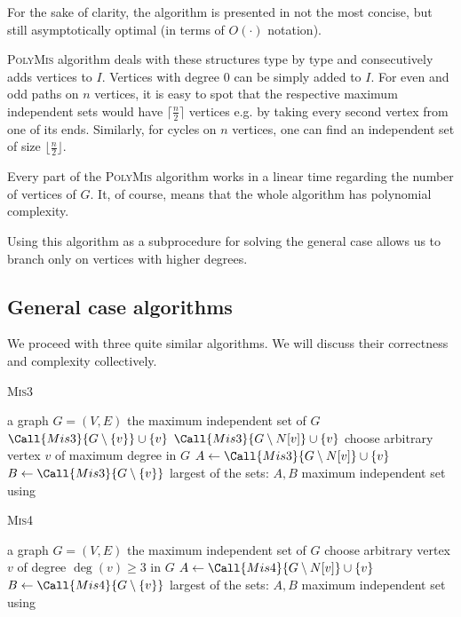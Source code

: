 For the sake of clarity, the algorithm is presented in not the most concise, but still asymptotically optimal (in terms of $O(\cdot)$ notation).

\textsc{PolyMis} algorithm deals with these structures type by type and consecutively adds vertices to $I$. Vertices with degree $0$ can be simply added to $I$. For even and odd paths on $n$ vertices, it is easy to spot that the respective maximum independent sets would have $\lceil\frac{n}{2}\rceil$ vertices e.g. by taking every second vertex from one of its ends. Similarly, for cycles on $n$ vertices, one can find an independent set of size $\lfloor\frac{n}{2}\rfloor$.

Every part of the \textsc{PolyMis} algorithm works in a linear time regarding the number of vertices of $G$. It, of course, means that the whole algorithm has polynomial complexity.

Using this algorithm as a subprocedure for solving the general case allows us to branch only on vertices with higher degrees. 

\subsection{General case algorithms}

We proceed with three quite similar algorithms. We will discuss their correctness and complexity collectively.

\begin{algorithm}[H]
\caption{\textsc{Mis3}}\label{mis3}
\begin{algorithmic}[1]
\Require a graph $G=(V,E)$
\Ensure the maximum independent set of $G$
         \State \Return $\Call{Mis3}{G\setminus \{v\}} \cup \{v\}$
    \EndIf
        \State \Return $\Call{Mis3}{G\setminus N[v]} \cup \{v\}$
    \EndIf
        \State choose arbitrary vertex $v$ of maximum degree in $G$
        \State $A \gets \Call{Mis3}{G\setminus N[v]} \cup \{v\}$
        \State $B \gets \Call{Mis3}{G\setminus \{v\}}$
        \State \Return largest of the sets: $A, B$
    \Else
        \State \Return maximum independent set using 
    \EndIf
\EndProcedure
\end{algorithmic}
\end{algorithm}

\begin{algorithm}[H]
\caption{\textsc{Mis4}}\label{alg:mis4}
\begin{algorithmic}[1]
\Require a graph $G=(V,E)$
\Ensure the maximum independent set of $G$
        \State choose arbitrary vertex $v$ of degree $\deg(v) \geq 3$ in $G$
        \State $A \gets \Call{Mis4}{G\setminus N[v]} \cup \{v\}$
        \State $B \gets \Call{Mis4}{G\setminus \{v\}}$
        \State \Return largest of the sets: $A, B$
    \Else 
        \State \Return maximum independent set using 
    \EndIf
\EndProcedure
\end{algorithmic}
\end{algorithm}

